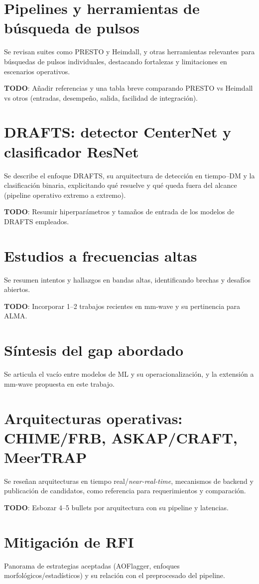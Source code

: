 
\section{Pipelines y herramientas de búsqueda de pulsos}
Se revisan suites como PRESTO y Heimdall, y otras herramientas relevantes para búsquedas de pulsos individuales, destacando fortalezas y limitaciones en escenarios operativos.

\textbf{TODO}: Añadir referencias y una tabla breve comparando PRESTO vs Heimdall vs otros (entradas, desempeño, salida, facilidad de integración).

\section{DRAFTS: detector CenterNet y clasificador ResNet}
Se describe el enfoque DRAFTS, su arquitectura de detección en tiempo--DM y la clasificación binaria, explicitando qué resuelve y qué queda fuera del alcance (pipeline operativo extremo a extremo).

\textbf{TODO}: Resumir hiperparámetros y tamaños de entrada de los modelos de DRAFTS empleados.

\section{Estudios a frecuencias altas}
Se resumen intentos y hallazgos en bandas altas, identificando brechas y desafíos abiertos.

\textbf{TODO}: Incorporar 1–2 trabajos recientes en mm-wave y su pertinencia para ALMA.

\section{Síntesis del gap abordado}
Se articula el vacío entre modelos de ML y su operacionalización, y la extensión a mm-wave propuesta en este trabajo.

\section{Arquitecturas operativas: CHIME/FRB, ASKAP/CRAFT, MeerTRAP}
Se reseñan arquitecturas en tiempo real/\textit{near-real-time}, mecanismos de backend y publicación de candidatos, como referencia para requerimientos y comparación.

\textbf{TODO}: Esbozar 4–5 bullets por arquitectura con su pipeline y latencias.

\section{Mitigación de RFI}
Panorama de estrategias aceptadas (AOFlagger, enfoques morfológicos/estadísticos) y su relación con el preprocesado del pipeline.


